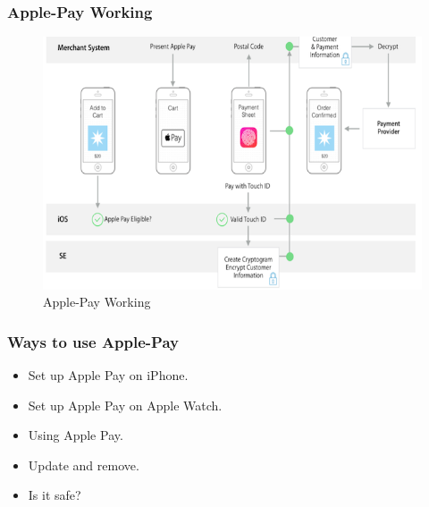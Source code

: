 \documentclass[handout]{beamer}
\begin{document}
\begin{frame}
\frametitle{Apple-Pay Working} 
\begin{figure}[h]
\begin{center}
\includegraphics[scale=0.4,angle=360]{apple2.png}
\caption{Apple-Pay Working}
\end{center}
\end{figure}

\end{frame}
\begin{frame}
\frametitle{Ways to use Apple-Pay }
\begin{itemize}
\item  Set up Apple Pay on iPhone.
\item  Set up Apple Pay on Apple Watch.
\item  Using Apple Pay.
\item  Update and remove.
\item  Is it safe?

\end{itemize}

\end{frame}

\end{document}

